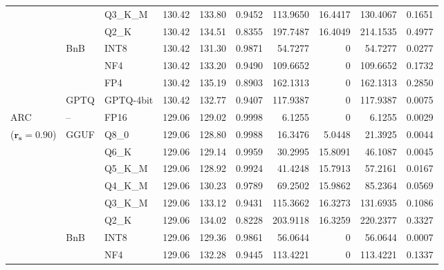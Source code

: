 \begin{longtable}{ll l rrrrrrr}
 &  & Q3\_K\_M & 130.42 & 133.80 & \cellcolor{red!18} 0.9452 & \cellcolor{red!18} 113.9650 & 16.4417 & \cellcolor{red!18} 130.4067 & \cellcolor{red!18} 0.1651 \\
 &  & Q2\_K & 130.42 & 134.51 & \cellcolor{red!18} 0.8355 & \cellcolor{red!18} 197.7487 & 16.4049 & \cellcolor{red!18} 214.1535 & \cellcolor{red!18} 0.4977 \\
 & BnB & INT8 & 130.42 & 131.30 & 0.9871 & 54.7277 & \cellcolor{cyan!12} $0$ & 54.7277 & 0.0277 \\
 &  & NF4 & 130.42 & 133.20 & \cellcolor{red!18} 0.9490 & \cellcolor{red!18} 109.6652 & \cellcolor{cyan!12} $0$ & \cellcolor{red!18} 109.6652 & \cellcolor{red!18} 0.1732 \\
 &  & FP4 & 130.42 & 135.19 & \cellcolor{red!18} 0.8903 & \cellcolor{red!18} 162.1313 & \cellcolor{cyan!12} $0$ & \cellcolor{red!18} 162.1313 & \cellcolor{red!18} 0.2850 \\
 & GPTQ & GPTQ-4bit & 130.42 & 132.77 & \cellcolor{red!18} 0.9407 & \cellcolor{red!18} 117.9387 & \cellcolor{cyan!12} $0$ & \cellcolor{red!18} 117.9387 & \cellcolor{red!18} 0.0075 \\
\midrule
ARC & -- & FP16 & 129.06 & 129.02 & 0.9998 & 6.1255 & \cellcolor{cyan!12} $0$ & 6.1255 & 0.0029 \\
{\small ($\mathbf{r_s{=}0.90}$)} & GGUF & Q8\_0 & 129.06 & 128.80 & 0.9988 & 16.3476 & 5.0448 & 21.3925 & 0.0044 \\
 &  & Q6\_K & 129.06 & 129.14 & 0.9959 & 30.2995 & 15.8091 & 46.1087 & 0.0045 \\
 &  & Q5\_K\_M & 129.06 & 128.92 & 0.9924 & 41.4248 & 15.7913 & 57.2161 & 0.0167 \\
 &  & Q4\_K\_M & 129.06 & 130.23 & 0.9789 & 69.2502 & 15.9862 & 85.2364 & 0.0569 \\
 &  & Q3\_K\_M & 129.06 & 133.12 & \cellcolor{red!18} 0.9431 & \cellcolor{red!18} 115.3662 & 16.3273 & \cellcolor{red!18} 131.6935 & \cellcolor{red!18} 0.1086 \\
 &  & Q2\_K & 129.06 & 134.02 & \cellcolor{red!18} 0.8228 & \cellcolor{red!18} 203.9118 & 16.3259 & \cellcolor{red!18} 220.2377 & \cellcolor{red!18} 0.3327 \\
 & BnB & INT8 & 129.06 & 129.36 & 0.9861 & 56.0644 & \cellcolor{cyan!12} $0$ & 56.0644 & 0.0007 \\
 &  & NF4 & 129.06 & 132.28 & \cellcolor{red!18} 0.9445 & \cellcolor{red!18} 113.4221 & \cellcolor{cyan!12} $0$ & \cellcolor{red!18} 113.4221 & \cellcolor{red!18} 0.1337 \\

\end{longtable}
